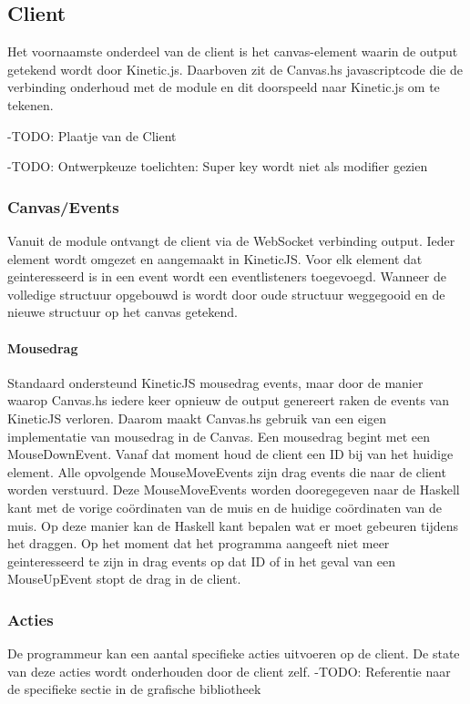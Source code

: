 
\subsection{Client}
Het voornaamste onderdeel van de client is het canvas-element waarin de output getekend wordt door Kinetic.js. Daarboven zit de Canvas.hs javascriptcode die de verbinding onderhoud met de module en dit doorspeeld naar Kinetic.js om te tekenen.

-TODO: Plaatje van de Client


-TODO: Ontwerpkeuze toelichten: Super key wordt niet als modifier gezien

\subsubsection{Canvas/Events}
Vanuit de module ontvangt de client via de WebSocket verbinding output. Ieder element wordt omgezet en aangemaakt in KineticJS. Voor elk element dat geinteresseerd is in een event wordt een eventlisteners toegevoegd. Wanneer de volledige structuur opgebouwd is wordt door oude structuur weggegooid en de nieuwe structuur op het canvas getekend.

\paragraph{Mousedrag}
Standaard ondersteund KineticJS mousedrag events, maar door de manier waarop Canvas.hs iedere keer opnieuw de output genereert raken de events van KineticJS verloren. Daarom maakt Canvas.hs gebruik van een eigen implementatie van mousedrag in de Canvas. Een mousedrag begint met een MouseDownEvent. Vanaf dat moment houd de client een ID bij van het huidige element. Alle opvolgende MouseMoveEvents zijn drag events die naar de client worden verstuurd. Deze MouseMoveEvents worden dooregegeven naar de Haskell kant met de vorige coördinaten van de muis en de huidige coördinaten van de muis.
Op deze manier kan de Haskell kant bepalen wat er moet gebeuren tijdens het draggen. Op het moment dat het programma aangeeft niet meer geinteresseerd te zijn in drag events op dat ID of in het geval van een MouseUpEvent stopt de drag in de client.

\subsubsection{Acties}
De programmeur kan een aantal specifieke acties uitvoeren op de client. De state van deze acties wordt onderhouden door de client zelf.
-TODO: Referentie naar de specifieke sectie in de grafische bibliotheek

